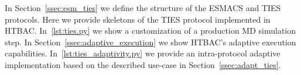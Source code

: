
In Section~\ref{ssec:esm_ties} we define the structure of the ESMACS and
TIES protocols. Here we provide skeletons of the TIES protocol implemented in 
HTBAC. In~\ref{lst:ties.py} we show a customization of a production MD 
simulation step. In Section~\ref{ssec:adaptive_execution} we show HTBAC's 
adaptive execution capabilities. In~\ref{lst:ties_adaptivity.py} we provide an 
intra-protocol adaptive implementation based on the described use-case in 
Section~\ref{ssec:adapt_ties}. 








